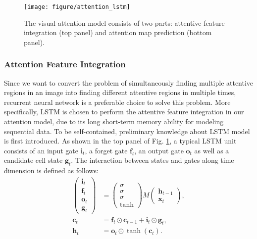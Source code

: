 \documentclass[journal]{IEEEtran}
\begin{document}
\begin{figure}[!t]
  \centering
  \texttt{[image: figure/attention\_lstm]}
  \vspace{-0.1in}  
  \caption{The visual attention model consists of two parts: attentive feature integration (top panel) and attention map prediction (bottom panel).}
  \label{fig:attention_lstm}
  \vspace{-0.2in}
\end{figure}

\subsubsection{Attention Feature Integration}
Since we want to convert the problem of simultaneously finding multiple attentive regions in an image into finding different attentive regions in multiple times, recurrent neural network is a preferable choice to solve this problem. More specifically, LSTM \cite{lstm} is chosen to perform the attentive feature integration in our attention model, due to its long short-term memory ability for modeling sequential data. To be self-contained, preliminary knowledge about LSTM model is first introduced. As shown in the top panel of Fig. \ref{fig:attention_lstm}, a typical LSTM unit consists of an input gate $\mathbf{i}_t$, a forget gate $\mathbf{f}_t$, an output gate $\mathbf{o}_t$ as well as a candidate cell state $\mathbf{g}_t$. The interaction between states and gates along time dimension is defined as follows:
\begin{align}
  \begin{pmatrix}
    \mathbf{i}_t\\ \mathbf{f}_t\\ \mathbf{o}_t\\ \mathbf{g}_t
  \end{pmatrix} &=
  \begin{pmatrix}
    \sigma \\ \sigma \\ \sigma \\ \text{tanh}
  \end{pmatrix}
  M
  \begin{pmatrix}
    \mathbf{h}_{t-1}\\ \mathbf{x}_t
  \end{pmatrix},\nonumber \\
  \mathbf{c}_t &= \mathbf{f}_t \odot \mathbf{c}_{t-1} + \mathbf{i}_t \odot \mathbf{g}_t,\\
  \mathbf{h}_t &= \mathbf{o}_t \odot \tanh\left(\mathbf{c}_t\right). \nonumber
\end{align}
\end{document}
